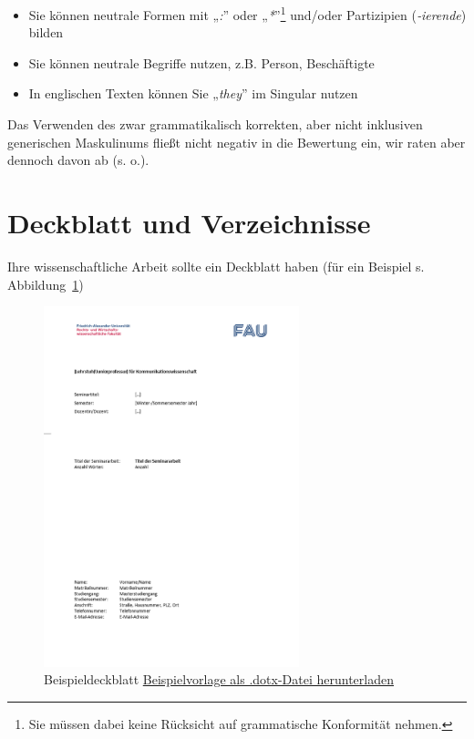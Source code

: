 \documentclass[
  letterpaper,
  DIV=11]{scrreprt}
\begin{document}
\begin{itemize}
\item
  Sie können neutrale Formen mit „\emph{:}'' oder „\emph{*}''\footnote{Sie
    müssen dabei keine Rücksicht auf grammatische Konformität nehmen.}
  und/oder Partizipien (\emph{‑ierende}) bilden
\item
  Sie können neutrale Begriffe nutzen, z.B. Person, Beschäftigte
\item
  In englischen Texten können Sie „\emph{they}'' im Singular nutzen
\end{itemize}

Das Verwenden des zwar grammatikalisch korrekten, aber nicht inklusiven
generischen Maskulinums fließt nicht negativ in die Bewertung ein, wir
raten aber dennoch davon ab (s. o.).

\hypertarget{deckblatt-und-verzeichnisse}{%
\section{Deckblatt und
Verzeichnisse}\label{deckblatt-und-verzeichnisse}}

Ihre wissenschaftliche Arbeit sollte ein Deckblatt haben (für ein
Beispiel s. Abbildung~\ref{fig-vorlage_deckblatt})

\begin{figure}

{\centering \includegraphics[width=0.66\textwidth,height=\textheight]{./img/vorlage_deckblatt.png}

}

\caption{\label{fig-vorlage_deckblatt}Beispieldeckblatt \textbar{}
{\href{templates/title_page_template.dotx}{Beispielvorlage als
.dotx-Datei herunterladen}}}

\end{figure}
\end{document}
